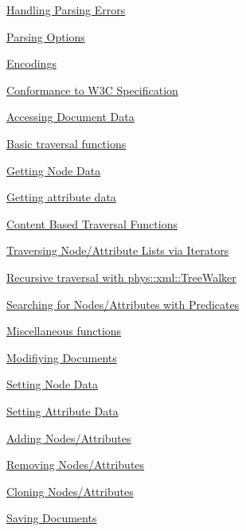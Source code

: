 \begin{DoxyItemize}
\begin{DoxyItemize}
\item \hyperlink{XMLManual_XMLLoadingErrors}{Handling Parsing Errors}
\item \hyperlink{XMLManual_XMLLoadingParsingOptions}{Parsing Options}
\item \hyperlink{XMLManual_XMLLoadingEncodings}{Encodings}
\item \hyperlink{XMLManual_XMLLoadingStandards}{Conformance to W3C Specification}
\end{DoxyItemize}
\item \hyperlink{XMLManual_XMLAccessing}{Accessing Document Data}
\begin{DoxyItemize}
\item \hyperlink{XMLManual_XMLAccessingBasics}{Basic traversal functions}
\item \hyperlink{XMLManual_XMLAccessingNodeData}{Getting Node Data}
\item \hyperlink{XMLManual_XMLAccessingAttributeData}{Getting attribute data}
\item \hyperlink{XMLManual_XMLAccessingContentBased}{Content Based Traversal Functions}
\item \hyperlink{XMLManual_XMLAccessingIterators}{Traversing Node/Attribute Lists via Iterators}
\item \hyperlink{XMLManual_XMLAccessingWalker}{Recursive traversal with phys::xml::TreeWalker}
\item \hyperlink{XMLManual_XMLAccessingPredicates}{Searching for Nodes/Attributes with Predicates}
\item \hyperlink{XMLManual_XMLAccessingMisc}{Miscellaneous functions}
\end{DoxyItemize}
\item \hyperlink{XMLManual_XMLModifying}{Modifiying Documents}
\begin{DoxyItemize}
\item \hyperlink{XMLManual_XMLModifyingNodeData}{Setting Node Data}
\item \hyperlink{XMLManual_XMLModifyingAttributeData}{Setting Attribute Data}
\item \hyperlink{XMLManual_XMLModifyingAdding}{Adding Nodes/Attributes}
\item \hyperlink{XMLManual_XMLModifyingRemoving}{Removing Nodes/Attributes}
\item \hyperlink{XMLManual_XMLModifyingCloning}{Cloning Nodes/Attributes}
\end{DoxyItemize}
\item \hyperlink{XMLManual_XMLSaving}{Saving Documents}
\begin{DoxyItemize}

\end{DoxyItemize}
\end{DoxyItemize}
